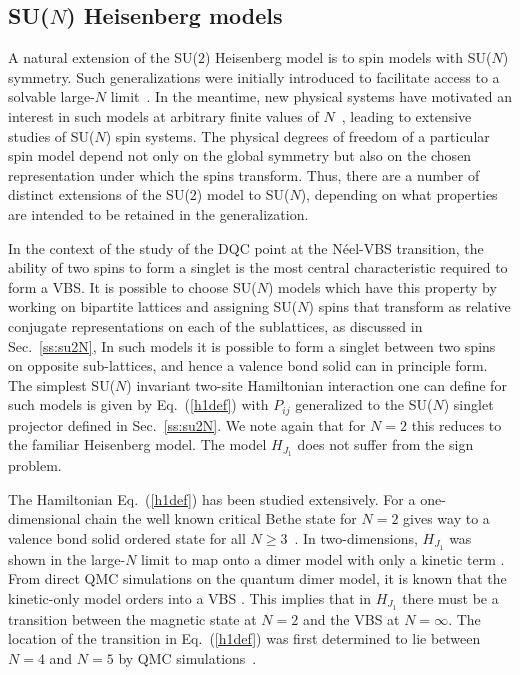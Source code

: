 \documentclass[range]{ar2e}
\begin{document}
\subsection{SU($N$) Heisenberg models}
\label{ss:j1N}
A natural extension of the SU($2$) Heisenberg model is to spin models with SU($N$) symmetry. Such generalizations were initially introduced to
facilitate access to a solvable large-$N$ limit~\cite{affleck1985:lgN,Read89}. In the meantime, new physical systems have motivated an interest 
in such models at arbitrary finite values of $N$~\cite{gorshkov2010:sun,kugel1982:kk}, leading to extensive studies of SU($N$) spin systems. The 
physical degrees of freedom of a particular spin model depend not only on the global symmetry but also on the chosen representation under which the 
spins transform. Thus, there are a number of distinct extensions of the SU($2$) model to SU($N$), depending on what properties are intended to be retained 
in the generalization. 

In the context of the study of the DQC point at the N\'eel-VBS transition, the ability of two spins to form a singlet is the most
central characteristic required to form a VBS. It is possible to choose SU($N$) models which have this property by working on bipartite lattices and
assigning SU($N$) spins that transform as relative conjugate representations on each of the sublattices, as discussed in Sec.~\ref{ss:su2N}, In such 
models it is possible to form a singlet between two spins on opposite sub-lattices, and hence a valence bond solid can in principle form.  The simplest 
SU($N$) invariant two-site Hamiltonian interaction one can define for such models is given by Eq.~(\ref{h1def}) with $P_{ij}$ generalized to the SU($N$) 
singlet projector defined in Sec.~\ref{ss:su2N}. We note again that for $N=2$ this reduces to the familiar Heisenberg model. The model $H_{J_1}$ does 
not suffer from the sign problem. 

The Hamiltonian Eq.~(\ref{h1def}) has been studied extensively. For a one-dimensional chain the well known critical Bethe state for $N=2$ gives way to a 
valence bond solid ordered state for all $N\geq 3$~\cite{barber1989:d1n3_vbs,klumper1989:d1n3_vbs,affleck1985:lgN}.   In two-dimensions, $H_{J_1}$ was shown 
in the large-$N$ limit to map onto a dimer model with only a kinetic term \cite{read1989:nucphysB}. From direct QMC simulations on the quantum dimer model, 
it is known that the kinetic-only model orders into a VBS \cite{sachdev1989:qd_vbs}.  This implies that in $H_{J_1}$ there must be a transition between the 
magnetic state at $N=2$ and the VBS at $N=\infty$.  The location of the transition in Eq.~(\ref{h1def}) was first determined to lie between $N=4$ and $N=5$ 
by QMC simulations~\cite{harada2003:sun}.
\end{document}
